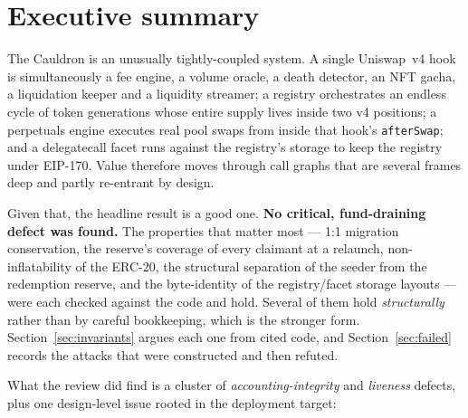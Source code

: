 \documentclass[11pt,a4paper]{article}
\newcommand{\code}[1]{\texttt{\small #1}}
\begin{document}
\tableofcontents
\newpage

\section{Executive summary}

The Cauldron is an unusually tightly-coupled system. A single Uniswap~v4 hook is
simultaneously a fee engine, a volume oracle, a death detector, an NFT gacha, a
liquidation keeper and a liquidity streamer; a registry orchestrates an endless
cycle of token generations whose entire supply lives inside two v4 positions; a
perpetuals engine executes real pool swaps from inside that hook's
\code{afterSwap}; and a delegatecall facet runs against the registry's storage to
keep the registry under EIP-170. Value therefore moves through call graphs that
are several frames deep and partly re-entrant by design.

Given that, the headline result is a good one. \textbf{No critical,
fund-draining defect was found.} The properties that matter most --- 1:1
migration conservation, the reserve's coverage of every claimant at a relaunch,
non-inflatability of the ERC-20, the structural separation of the seeder from the
redemption reserve, and the byte-identity of the registry/facet storage layouts
--- were each checked against the code and hold. Several of them hold
\emph{structurally} rather than by careful bookkeeping, which is the stronger
form. Section~\ref{sec:invariants} argues each one from cited code, and
Section~\ref{sec:failed} records the attacks that were constructed and then
refuted.

What the review did find is a cluster of \emph{accounting-integrity} and
\emph{liveness} defects, plus one design-level issue rooted in the deployment
target:
\end{document}
